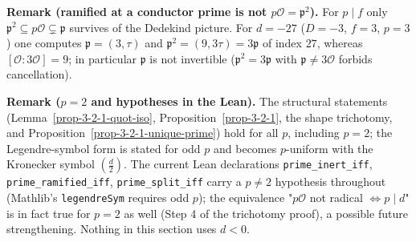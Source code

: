 \medskip

\noindent\textbf{Remark (ramified at a conductor prime is not
$p\mathcal{O} = \mathfrak{p}^2$).} For $p \mid f$ only $\mathfrak{p}^2
\subseteq p\mathcal{O} \subsetneq \mathfrak{p}$ survives of the Dedekind
picture. For $d = -27$ ($D = -3$, $f = 3$, $p = 3$) one computes
$\mathfrak{p} = (3, \tau)$ and $\mathfrak{p}^2 = (9, 3\tau) = 3\mathfrak{p}$
of index $27$, whereas $[\mathcal{O} : 3\mathcal{O}] = 9$; in particular
$\mathfrak{p}$ is not invertible ($\mathfrak{p}^2 = 3\mathfrak{p}$ with
$\mathfrak{p} \neq 3\mathcal{O}$ forbids cancellation).

\medskip

\noindent\textbf{Remark ($p = 2$ and hypotheses in the Lean).} The
structural statements (Lemma~\ref{prop-3-2-1-quot-iso},
Proposition~\ref{prop-3-2-1}, the shape trichotomy, and
Proposition~\ref{prop-3-2-1-unique-prime}) hold for all $p$, including
$p = 2$; the Legendre-symbol form is stated for odd $p$ and becomes
$p$-uniform with the Kronecker symbol $\left(\frac d2\right)$. The current
Lean declarations \texttt{prime\_inert\_iff}, \texttt{prime\_ramified\_iff},
\texttt{prime\_split\_iff} carry a $p \neq 2$ hypothesis throughout
(Mathlib's \texttt{legendreSym} requires odd $p$); the equivalence
"$p\mathcal{O}$ not radical $\iff p \mid d$" is in fact true for $p = 2$ as
well (Step 4 of the trichotomy proof), a possible future strengthening.
Nothing in this section uses $d < 0$.
